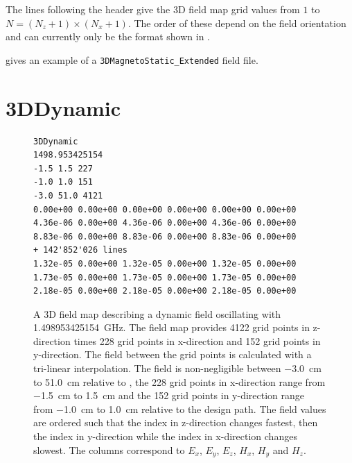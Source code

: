The lines following the header give the 3D field map grid values from $1$ to $N= (N_{z} + 1) \times (N_{x} + 1)$.
The order of these depend on the field orientation  and can currently only be the
format shown in .

 gives an example of a \texttt{3DMagnetoStatic\_Extended} field file.

\section{3DDynamic}
\label{sec:3DDynamic}
\begin{figure}[h]
  \begin{fmpage}
\begin{verbatim}
3DDynamic
1498.953425154
-1.5 1.5 227
-1.0 1.0 151
-3.0 51.0 4121
0.00e+00 0.00e+00 0.00e+00 0.00e+00 0.00e+00 0.00e+00
4.36e-06 0.00e+00 4.36e-06 0.00e+00 4.36e-06 0.00e+00
8.83e-06 0.00e+00 8.83e-06 0.00e+00 8.83e-06 0.00e+00
+ 142'852'026 lines
1.32e-05 0.00e+00 1.32e-05 0.00e+00 1.32e-05 0.00e+00
1.73e-05 0.00e+00 1.73e-05 0.00e+00 1.73e-05 0.00e+00
2.18e-05 0.00e+00 2.18e-05 0.00e+00 2.18e-05 0.00e+00
\end{verbatim}
  \end{fmpage}
  \caption[Example of a 3DDynamic field map]{A 3D field map describing a dynamic field oscillating with \SI{1.498953425154}{\giga\hertz}.
    The field map provides 4122 grid points in z-direction times 228 grid points in x-direction and 152 grid points in y-direction.
    The field between the grid points is calculated with a tri-linear interpolation. The field is non-negligible between \SI{-3.0}{\centi\meter}
    to \SI{51.0}{\centi\meter} relative to , the 228 grid points in x-direction range from \SI{-1.5}{\centi\meter} to \SI{1.5}{\centi\meter} and the 152 grid
    points in y-direction range from \SI{-1.0}{\centi\meter} to \SI{1.0}{\centi\meter} relative to the design path. The field values are ordered such that the index in z-direction changes fastest, then the index in y-direction while the index in x-direction changes
    slowest. The columns correspond to $E_x$, $E_y$, $E_z$, $H_x$, $H_y$ and $H_z$.}
  \label{fig:3DDynamic}
\end{figure}

